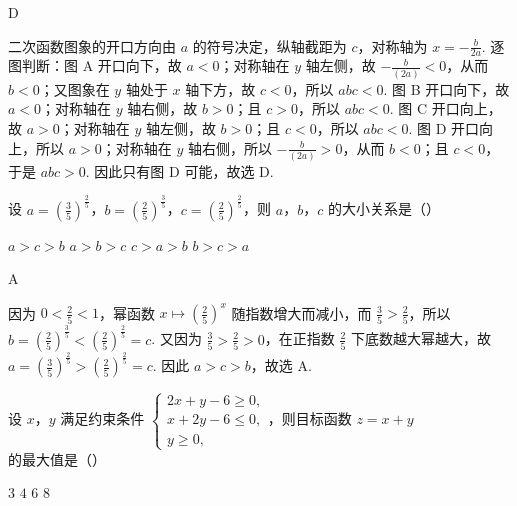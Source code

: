 \begin{answer}
D
\end{answer}

\begin{solution}
二次函数图象的开口方向由 \(a\) 的符号决定，纵轴截距为 \(c\)，对称轴为
\(x=-\frac{b}{2a}\).
逐图判断：图 A 开口向下，故 \(a<0\)；对称轴在 \(y\) 轴左侧，故 \(-\frac{b}{(2a)}<0\)，从而 \(b<0\)；又图象在 \(y\) 轴处于 \(x\) 轴下方，故 \(c<0\)，所以 \(abc<0\). 图 B 开口向下，故 \(a<0\)；对称轴在 \(y\) 轴右侧，故 \(b>0\)；且 \(c>0\)，所以 \(abc<0\). 图 C 开口向上，故 \(a>0\)；对称轴在 \(y\) 轴左侧，故 \(b>0\)；且 \(c<0\)，所以 \(abc<0\). 图 D 开口向上，所以 \(a>0\)；对称轴在 \(y\) 轴右侧，所以 \(-\frac{b}{(2a)}>0\)，从而 \(b<0\)；且 \(c<0\)，于是 \(abc>0\). 因此只有图 D 可能，故选 D.
\end{solution}

\begin{problem}
设 \(a = \left(\frac{3}{5}\right)^{\frac{2}{5}}\)，\(b = \left(\frac{2}{5}\right)^{\frac{3}{5}}\)，\(c = \left(\frac{2}{5}\right)^{\frac{2}{5}}\)，则 \(a\)，\(b\)，\(c\) 的大小关系是（\quad）

\choices
    {\(a > c > b\)}
    {\(a > b > c\)}
    {\(c > a > b\)}
    {\(b > c > a\)}
\end{problem}

\begin{answer}
A
\end{answer}

\begin{solution}
因为 \(0<\frac25<1\)，幂函数 \(x\mapsto(\frac25)^x\) 随指数增大而减小，而
\(\frac35>\frac25\)，所以
\(b=\left(\frac25\right)^{\frac{3}{5}}<\left(\frac25\right)^{\frac{2}{5}}=c\).
又因为 \(\frac35>\frac25>0\)，在正指数 \(\frac{2}{5}\) 下底数越大幂越大，故
\(a=\left(\frac35\right)^{\frac{2}{5}}>\left(\frac25\right)^{\frac{2}{5}}=c\).
因此 \(a>c>b\)，故选 A.
\end{solution}

\begin{problem}
设 \(x\)，\(y\) 满足约束条件 \(\begin{cases}
2x + y - 6 \geqslant 0,\\
x + 2y - 6 \leqslant 0,\\
y \geqslant 0,
\end{cases}\)，则目标函数 \(z = x + y\) 的最大值是（\quad）

\choices
    {\(3\)}
    {\(4\)}
    {\(6\)}
    {\(8\)}
\end{problem}

